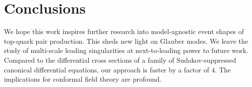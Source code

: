 \section{Conclusions}\label{sec:conclusions}

We hope this work inspires further research into model-agnostic event
shapes of top-quark pair production. This sheds new light on Glauber
modes. We leave the study of multi-scale leading singularities at
next-to-leading power to future work. Compared to the differential cross
sections of a family of Sudakov-suppressed canonical differential
equations, our approach is faster by a factor of 4. The implications for
conformal field theory are profound.


